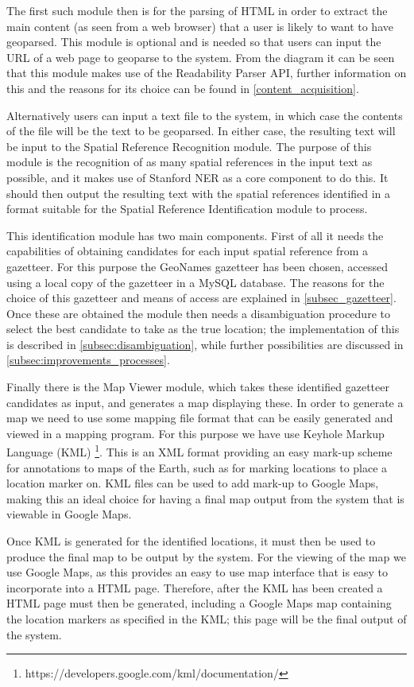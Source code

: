 \documentclass[12pt, a4paper]{report}
\begin{document}
The first such module then is for the parsing of HTML in order to extract the main content (as seen from a web browser) that a user is likely to want to have geoparsed. This module is optional and is needed so that users can input the URL of a web page to geoparse to the system. From the diagram it can be seen that this module makes use of the Readability Parser API, further information on this and the reasons for its choice can be found in \ref{content_acquisition}.

Alternatively users can input a text file to the system, in which case the contents of the file will be the text to be geoparsed. In either case, the resulting text will be input to the Spatial Reference Recognition module. The purpose of this module is the recognition of as many spatial references in the input text as possible, and it makes use of Stanford NER as a core component to do this. It should then output the resulting text with the spatial references identified in a format suitable for the Spatial Reference Identification module to process.

This identification module has two main components. First of all it needs the capabilities of obtaining candidates for each input spatial reference from a gazetteer.  For this purpose the GeoNames gazetteer has been chosen, accessed using a local copy of the gazetteer in a MySQL database. The reasons for the choice of this gazetteer and means of access are explained in \ref{subsec_gazetteer}. Once these are obtained the module then needs a disambiguation procedure to select the best candidate to take as the true location; the implementation of this is described in \ref{subsec:disambiguation}, while further possibilities are discussed in \ref{subsec:improvements_processes}.

Finally there is the Map Viewer module, which takes these identified gazetteer candidates as input, and generates a map displaying these. In order to generate a map we need to use some mapping file format that can be easily generated and viewed in a mapping program. For this purpose we have use Keyhole Markup Language (KML) \footnote{https://developers.google.com/kml/documentation/}. This is an XML format providing an easy mark-up scheme for annotations to maps of the Earth, such as for marking locations to place a location marker on. KML files can be used to add mark-up to Google Maps, making this an ideal choice for having a final map output from the system that is viewable in Google Maps.

Once KML is generated for the identified locations, it must then be used to produce the final map to be output by the system. For the viewing of the map we use Google Maps, as this provides an easy to use map interface that is easy to incorporate into a HTML page. Therefore, after the KML has been created a HTML page must then be generated, including a Google Maps map containing the location markers as specified in the KML; this page will be the final output of the system.
\end{document}
